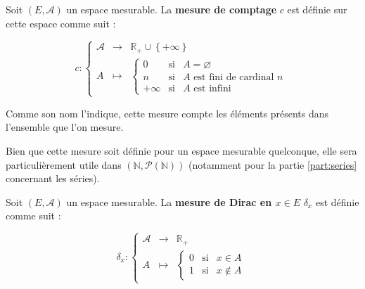 \documentclass[../integ-proba.tex]{subfiles}
\begin{document}
  \begin{defi}
    Soit $\left(E,\mathcal{A}\right)$ un espace mesurable.
    La \textbf{mesure de comptage} $c$ est définie sur cette espace comme suit :

    $$
      c :
    \left\{
    \begin{array}{ccc}
      \mathcal{A} & \longrightarrow & \mathbb{R}_+\cup\left\{+\infty\right\}\\
      A &                                   \longmapsto    &
        \left\{
        \begin{array}{rcl}
          0 & \text{si} & A = \varnothing\\
          n & \text{si} & A \text{ est fini de cardinal } n\\
          +\infty & \text{si} & A \text{ est infini}
        \end{array}
        \right.
    \end{array}
    \right.
    $$
  \end{defi}

  \begin{rem}
    Comme son nom l'indique, cette mesure compte les éléments présents dans l'ensemble que l'on mesure.
  \end{rem}

  \begin{rem}
    Bien que cette mesure soit définie pour un espace mesurable quelconque, elle sera particulièrement utile dans $\left(\mathbb{N},\mathcal{P}\left(\mathbb{N}\right)\right)$ (notamment pour la partie \ref{part:series} concernant les séries).
  \end{rem}


  \begin{defi}
    Soit $\left(E,\mathcal{A}\right)$ un espace mesurable.
    La \textbf{mesure de Dirac en $x \in E$} $\delta_x$ est définie comme suit :

    $$
      \delta_x :
    \left\{
    \begin{array}{ccc}
      \mathcal{A} & \longrightarrow & \mathbb{R}_+\\
      A &                                   \longmapsto    &
        \left\{
        \begin{array}{rcl}
          0 & \text{si} & x \in A\\
          1 & \text{si} & x \notin A
        \end{array}
        \right.
    \end{array}
    \right.
    $$
  \end{defi}
\end{document}
